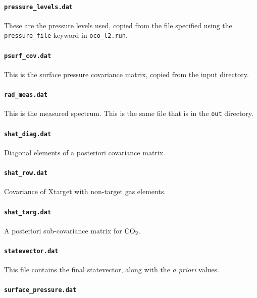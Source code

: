\documentclass{article}
\newcommand{\COtwo}{\ensuremath{\rm{CO}_2}}
\begin{document}
\paragraph{\texttt{pressure\_levels.dat}}

These are the pressure levels used, copied from the file specified
using the \texttt{pressure\_file} keyword in \texttt{oco\_l2.run}.

\paragraph{\texttt{psurf\_cov.dat}}

This is the surface pressure covariance matrix, copied from the
input directory.

\paragraph{\texttt{rad\_meas.dat}}

This is the measured spectrum.  This is the same file that is in the
\texttt{out} directory.

\paragraph{\texttt{shat\_diag.dat}}

Diagonal elements of a posteriori covariance matrix.

\paragraph{\texttt{shat\_row.dat}}

Covariance of Xtarget with non-target gas elements.

\paragraph{\texttt{shat\_targ.dat}}

A posteriori sub-covariance matrix for \COtwo.

\paragraph{\texttt{statevector.dat}}

This file contains the final statevector, along with the \textit{a
  priori} values.

\paragraph{\texttt{surface\_pressure.dat}}
\end{document}
